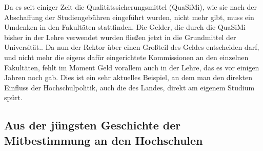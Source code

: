 Da es seit einiger Zeit die Qualitätssicherungsmittel (QuaSiMi), wie sie nach
der Abschaffung der Studiengebühren eingeführt wurden, nicht mehr gibt, muss
ein Umdenken in den Fakultäten stattfinden. Die Gelder, die durch die QuaSiMi
bisher in der Lehre verwendet wurden fließen jetzt in die Grundmittel der
Universität.. Da nun der Rektor über einen Großteil des Geldes entscheiden
darf, und nicht mehr die eigens dafür eingerichtete Kommissionen an den
einzelnen Fakultäten, fehlt im Moment Geld vorallem auch in der Lehre, das es
vor einigen Jahren noch gab.  Dies ist ein sehr aktuelles Beispiel, an dem man
den direkten Einfluss der Hochschulpolitik, auch die des Landes, direkt am
eigenem Studium spürt.

\subsection{Aus der jüngsten Geschichte der Mitbestimmung an den Hochschulen}


